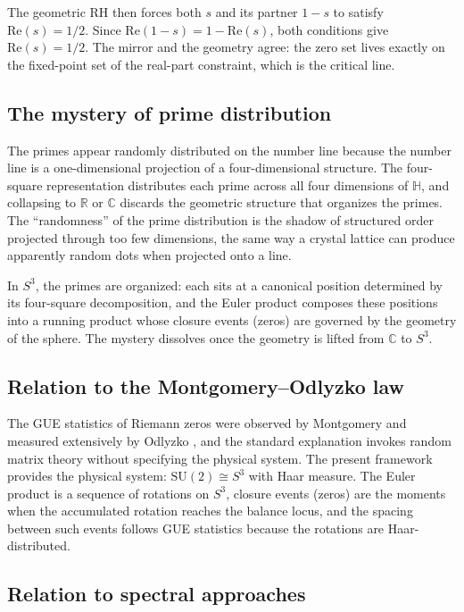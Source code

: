 \documentclass[12pt,a4paper]{article}
\theoremstyle{definition}
\theoremstyle{remark}
\begin{document}
The geometric RH then forces both $s$ and its partner $1-s$ to satisfy
$\mathrm{Re}(s) = 1/2$. Since $\mathrm{Re}(1-s) = 1 - \mathrm{Re}(s)$,
both conditions give $\mathrm{Re}(s) = 1/2$. The mirror and the geometry
agree: the zero set lives exactly on the fixed-point set of the real-part
constraint, which is the critical line.

\subsection{The mystery of prime distribution}

The primes appear randomly distributed on the number line because the number
line is a one-dimensional projection of a four-dimensional structure. The
four-square representation distributes each prime across all four dimensions of
$\mathbb{H}$, and collapsing to $\mathbb{R}$ or $\mathbb{C}$ discards the
geometric structure that organizes the primes. The ``randomness'' of the prime
distribution is the shadow of structured order projected through too few
dimensions, the same way a crystal lattice can produce apparently random dots
when projected onto a line.

In $S^3$, the primes are organized: each sits at a canonical position
determined by its four-square decomposition, and the Euler product composes
these positions into a running product whose closure events (zeros) are
governed by the geometry of the sphere. The mystery dissolves once the
geometry is lifted from $\mathbb{C}$ to $S^3$.

\subsection{Relation to the Montgomery--Odlyzko law}

The GUE statistics of Riemann zeros were observed by Montgomery
\cite{montgomery1973} and measured extensively by Odlyzko \cite{odlyzko1987},
and the standard explanation invokes random matrix theory without specifying
the physical system. The present framework provides the physical system:
$\mathrm{SU}(2) \cong S^3$ with Haar measure. The Euler product is a sequence
of rotations on $S^3$, closure events (zeros) are the moments when the
accumulated rotation reaches the balance locus, and the spacing between such
events follows GUE statistics because the rotations are Haar-distributed.

\subsection{Relation to spectral approaches}
\end{document}
